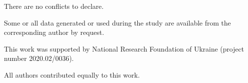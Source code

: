 \documentclass[sn-mathphys]{sn-jnl}%
\theoremstyle{thmstyleone}%
\theoremstyle{thmstyletwo}%
\theoremstyle{thmstylethree}%
\begin{document}
There are no conflicts to declare.

Some or all data generated or used during the study are available from the corresponding author by request.

This work was supported by National Research Foundation  of Ukraine (project number 2020.02/0036).

All authors contributed equally to this work.

%
%




\end{document}

